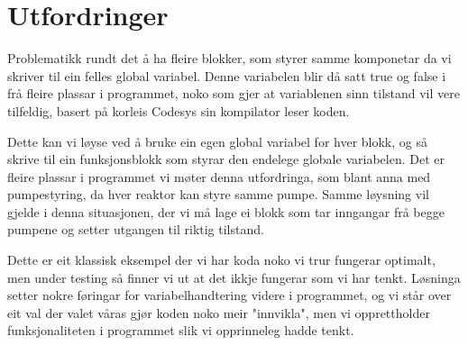 \section{Utfordringer}
\thispagestyle{fancy}

Problematikk rundt det å ha fleire blokker, som styrer samme komponetar da vi skriver til ein felles global variabel.
Denne variabelen blir då satt true og false i frå fleire plassar i programmet, noko som gjer at variablenen sinn tilstand vil vere tilfeldig, basert på korleis Codesys sin kompilator leser koden.

Dette kan vi løyse ved å bruke ein egen global variabel for hver blokk, og så skrive til ein funksjonsblokk som styrar den endelege globale variabelen.
Det er fleire plassar i programmet vi møter denna utfordringa, som blant anna med pumpestyring, da hver reaktor kan styre samme pumpe.
Samme løysning vil gjelde i denna situasjonen, der vi må lage ei blokk som tar inngangar frå begge pumpene og setter utgangen til riktig tilstand.

Dette er eit klassisk eksempel der vi har koda noko vi trur fungerar optimalt, men under testing så finner vi ut at det ikkje fungerar som vi har tenkt.
Løsninga setter nokre føringar for variabelhandtering videre i programmet, og vi står over eit val der valet våras gjør koden noko meir "innvikla", men vi opprettholder
funksjonaliteten i programmet slik vi opprinneleg hadde tenkt.
